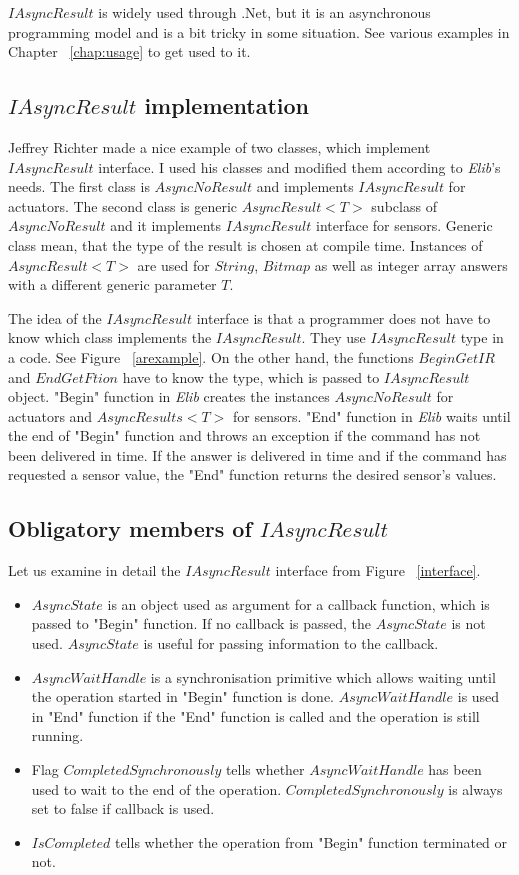 	$IAsyncResult$ is widely used through .Net, but it is an asynchronous programming model
	and is a bit tricky in some situation. See various examples in Chapter ~\ref{chap:usage} 
	to get used to it.

\subsection{$IAsyncResult$ implementation} \label{sec:iasyncimpl}
	Jeffrey Richter \cite{IAsync} made a nice example of two classes, which implement $IAsyncResult$ interface.
	I used his classes and modified them according to {\it Elib}'s needs.
	The first class is $AsyncNoResult$ and implements $IAsyncResult$ for actuators.
	The second class is generic $AsyncResult<T>$ subclass of $AsyncNoResult$ and 
	it implements $IAsyncResult$ interface for sensors.
	Generic class mean, that the type of the result is chosen at compile time. %
	Instances of $AsyncResult<T>$ are used
	for $String$, $Bitmap$ as well as integer array answers with a different generic parameter $T$.
	
	The idea of the $IAsyncResult$ interface is that a programmer does not have to know which
	class implements the $IAsyncResult$. They use $IAsyncResult$ type in a code. See Figure ~\ref{arexample}. 
	On the other hand, the functions $BeginGetIR$ and $EndGetFtion$ have to know the type, which is passed to $IAsyncResult$ object.
	"Begin" function in {\it Elib} creates the instances $AsyncNoResult$ for actuators and $AsyncResults<T>$ for sensors.
	"End" function in {\it Elib} waits until the end of "Begin" function and 
	throws an exception if the command has not been delivered in time.
	If the answer is delivered in time and if the command has requested a sensor value, 
	the "End" function returns the desired sensor's values.
	
\subsection*{Obligatory members of $IAsyncResult$} \label{sec:iasyncmemb}
	Let us examine in detail the $IAsyncResult$ interface from Figure ~\ref{interface}. 
	\begin{itemize}
	\item $AsyncState$ is an object used as argument for a callback function, which
	is passed to "Begin" function. If no callback is passed, the $AsyncState$ is not used. 
	$AsyncState$ is useful for passing information to the callback.
	\item $AsyncWaitHandle$ is a synchronisation primitive which allows waiting until the operation 
	started in "Begin" function is done.
	$AsyncWaitHandle$ is used in "End" function if the "End" function is called 
	and the operation is still running. 
	\item Flag $CompletedSynchronously$ tells whether  
	$AsyncWaitHandle$ has been used to wait to the end of the operation.
	$CompletedSynchronously$ is always set to false if callback is used.
	\item $IsCompleted$ tells whether the operation from "Begin" function terminated or not.
	\end{itemize}

